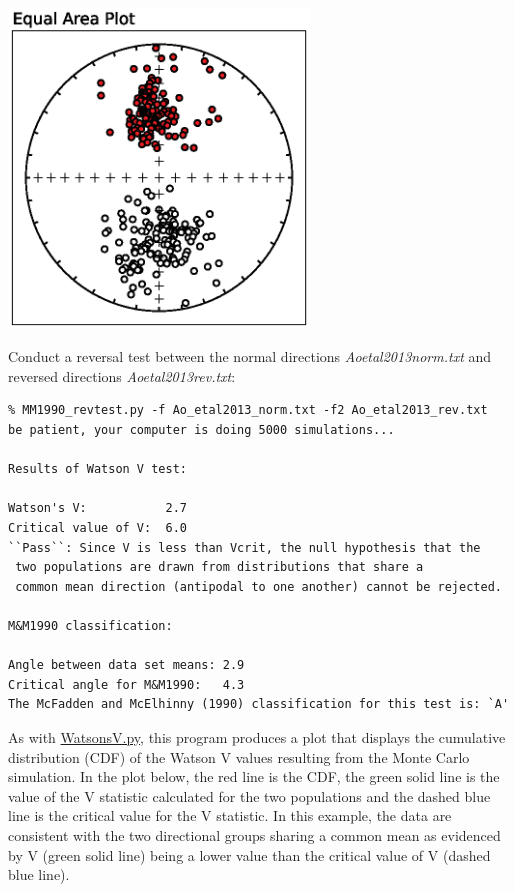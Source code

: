 \documentclass[11pt]{book}
\begin{document}
{{\includegraphics[width=8cm]{EPSfiles/Ao2013eq.eps}}

Conduct a reversal test between the normal directions \textit{Ao\textunderscore etal2013\textunderscore norm.txt} and reversed directions \textit{Ao\textunderscore etal2013\textunderscore rev.txt}:

\begin{verbatim}
% MM1990_revtest.py -f Ao_etal2013_norm.txt -f2 Ao_etal2013_rev.txt
be patient, your computer is doing 5000 simulations...

Results of Watson V test:

Watson's V:           2.7
Critical value of V:  6.0
``Pass``: Since V is less than Vcrit, the null hypothesis that the
 two populations are drawn from distributions that share a
 common mean direction (antipodal to one another) cannot be rejected.

M&M1990 classification:

Angle between data set means: 2.9
Critical angle for M&M1990:   4.3
The McFadden and McElhinny (1990) classification for this test is: `A'
\end{verbatim}

As with \href{#WatsonsV.py}{WatsonsV.py}, this program produces a plot that displays the cumulative distribution (CDF) of the Watson V values resulting from the Monte Carlo simulation. In the plot below, the red line is the CDF, the green solid line is the value of the V statistic calculated for the two populations and the dashed blue line is the critical value for the V statistic. In this example, the data are consistent with the two directional groups sharing a common mean as evidenced by V (green solid line) being a lower value than the critical value of V (dashed blue line).

}
\end{document}
